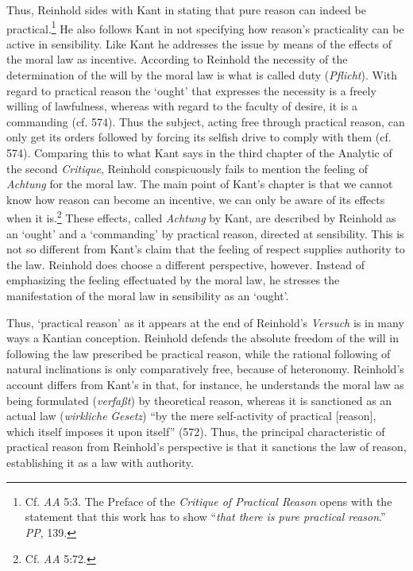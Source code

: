 Thus, Reinhold sides with Kant in stating that pure reason can indeed be practical.\footnote{ Cf. \textit{AA} 5:3. The Preface of the \textit{Critique of Practical Reason }opens with the statement that this work has to show ``\textit{that there is pure practical reason}.'' \textit{PP}, 139. } He also follows Kant in not specifying how reason's practicality can be active in sensibility. Like Kant he addresses the issue by means of the effects of the moral law as incentive. According to Reinhold the necessity of the determination of the will by the moral law is what is called duty (\textit{Pflicht}). With regard to practical reason the `ought' that expresses the necessity is a freely willing of lawfulness, whereas with regard to the faculty of desire, it is a commanding (cf. 574). Thus the subject, acting free through practical reason, can only get its orders followed by forcing its selfish drive to comply with them (cf. 574). Comparing this to what Kant says in the third chapter of the Analytic of the second \textit{Critique}, Reinhold conspicuously fails to mention the feeling of \textit{Achtung} for the moral law. The main point of Kant's chapter is that we cannot know how reason can become an incentive, we can only be aware of its effects when it is.\footnote{ Cf. \textit{AA }5:72. } These effects, called \textit{Achtung }by Kant, are described by Reinhold as an `ought' and a `commanding' by practical reason, directed at sensibility. This is not so different from Kant's claim that the feeling of respect supplies authority to the law. Reinhold does choose a different perspective, however. Instead of emphasizing the feeling effectuated by the moral law, he stresses the manifestation of the moral law in sensibility as an `ought'. 

Thus, `practical reason' as it appears at the end of Reinhold's \textit{Versuch} is in many ways a Kantian conception. Reinhold defends the absolute freedom of the will in following the law prescribed be practical reason, while the rational following of natural inclinations is only comparatively free, because of heteronomy. Reinhold's account differs from Kant's in that, for instance, he understands the moral law as being formulated (\textit{verfa\ss{}t}) by theoretical reason, whereas it is sanctioned as an actual law (\textit{wirkliche} \textit{Gesetz}) ``by the mere self{-}activity of practical [reason], which itself imposes it upon itself'' (572). Thus, the principal characteristic of practical reason from Reinhold's perspective is that it sanctions the law of reason, establishing it as a law with authority. 


